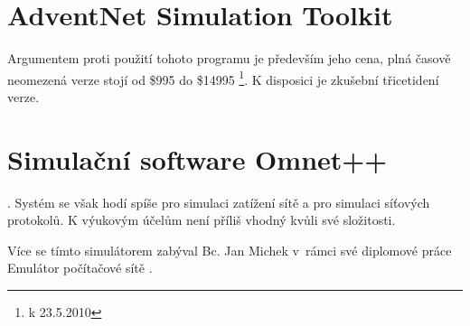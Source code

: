
\section{AdventNet Simulation Toolkit}


\cite{resersni_bakalarka} Argumentem proti použití tohoto programu je především jeho cena, plná časově neomezená verze stojí od \$995 do \$14995 \footnote{k 23.5.2010}. K disposici je zkušební třicetidení verze.




\section{Simulační software Omnet++}

\cite{resersni_bakalarka}. Systém se však hodí spíše pro simulaci zatížení sítě a pro simulaci síťových protokolů. K výukovým účelům není příliš vhodný kvůli své složitosti.

Více se tímto simulátorem zabýval Bc. Jan Michek v~rámci své diplomové práce Emulátor počítačové sítě \cite{reserse:omnet_dp}.

